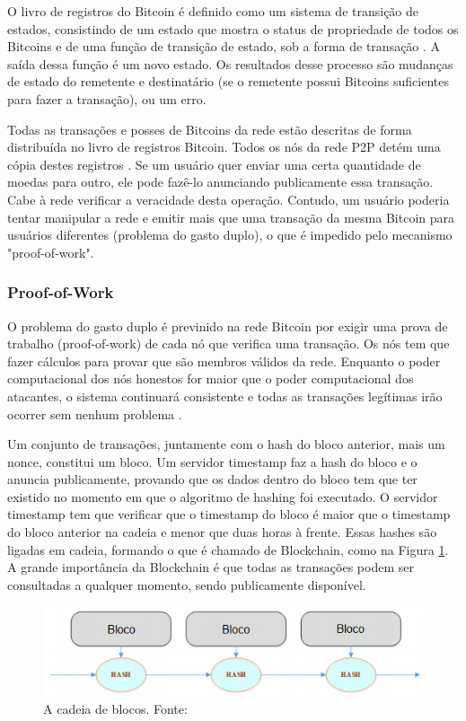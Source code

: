 \documentclass[openright]{normas-utf-tex} %
\begin{document}
O livro de registros do Bitcoin é definido como um sistema de transição de estados, consistindo de um estado que mostra o status de propriedade de todos os Bitcoins e de uma função de transição de estado, sob a forma de transação \cite{Vujicic2018}. A saída dessa função é um novo estado. Os resultados desse processo são mudanças de estado do remetente e destinatário (se o remetente possui Bitcoins suficientes para fazer a transação), ou um erro.

Todas as transações e posses de Bitcoins da rede estão descritas de forma distribuída no livro de registros Bitcoin. Todos os nós da rede P2P detém uma cópia destes registros \cite{Community}. Se um usuário quer enviar uma certa quantidade de moedas para outro, ele pode fazê-lo anunciando publicamente essa transação. Cabe à rede verificar a veracidade desta operação. Contudo, um usuário poderia tentar manipular a rede e emitir mais que uma transação da mesma Bitcoin para usuários diferentes (problema do gasto duplo), o que é impedido pelo mecanismo "proof-of-work".

\subsubsection{Proof-of-Work}

O problema do gasto duplo é previnido na rede Bitcoin por exigir uma prova de trabalho (proof-of-work) de cada nó que verifica uma transação. Os nós tem que fazer cálculos para provar que são membros válidos da rede. Enquanto o poder computacional dos nós honestos for maior que o poder computacional dos atacantes, o sistema continuará consistente e todas as transações legítimas irão ocorrer sem nenhum problema \cite{Tschorsch2016}.

Um conjunto de transações, juntamente com o hash do bloco anterior, mais um nonce, constitui um bloco. Um servidor timestamp faz a hash do bloco e o anuncia publicamente, provando que os dados dentro do bloco tem que ter existido no momento em que o algoritmo de hashing foi executado. O servidor timestamp tem que verificar que o timestamp do bloco é maior que o timestamp do bloco anterior na cadeia e menor que duas horas à frente. Essas hashes são ligadas em cadeia, formando o que é chamado de Blockchain, como na Figura \ref{fig:blockchain}. A grande importância da Blockchain é que todas as transações podem ser consultadas a qualquer momento, sendo publicamente disponível.

\begin{figure}[ht]
\centering
\includegraphics[width=1.0\textwidth]{blockchain.PNG}
\caption{A cadeia de blocos. Fonte: }
\label{fig:blockchain}
\end{figure}
\end{document}
